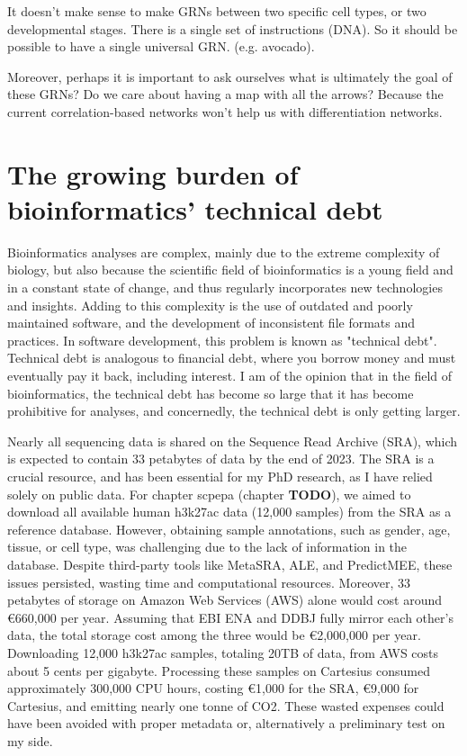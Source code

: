 It doesn't make sense to make GRNs between two specific cell types, or two developmental stages. There is a single set of instructions (DNA). So it should be possible to have a single universal GRN. (e.g. avocado).

Moreover, perhaps it is important to ask ourselves what is ultimately the goal of these GRNs? Do we care about having a map with all the arrows? Because the current correlation-based networks won't help us with differentiation networks. 

\section{The growing burden of bioinformatics' technical debt}

Bioinformatics analyses are complex, mainly due to the extreme complexity of biology, but also because the scientific field of bioinformatics is a young field and in a constant state of change, and thus regularly incorporates new technologies and insights. Adding to this complexity is the use of outdated and poorly maintained software, and the development of inconsistent file formats and practices. In software development, this problem is known as "technical debt". Technical debt is analogous to financial debt, where you borrow money and must eventually pay it back, including interest. I am of the opinion that in the field of bioinformatics, the technical debt has become so large that it has become prohibitive for analyses, and concernedly, the technical debt is only getting larger.

Nearly all sequencing data is shared on the Sequence Read Archive (SRA), which is expected to contain 33 petabytes of data by the end of 2023\cite{srawebsite,Katz2021}. The SRA is a crucial resource, and has been essential for my PhD research, as I have relied solely on public data. For chapter scpepa (chapter \textbf{TODO}), we aimed to download all available human h3k27ac data (12,000 samples) from the SRA as a reference database. However, obtaining sample annotations, such as gender, age, tissue, or cell type, was challenging due to the lack of information in the database. Despite third-party tools like MetaSRA, ALE, and PredictMEE, these issues persisted, wasting time and computational resources. Moreover, 33 petabytes of storage on Amazon Web Services (AWS) alone would cost around €660,000 per year\cite{amazon}. Assuming that EBI ENA and DDBJ fully mirror each other's data, the total storage cost among the three would be €2,000,000 per year. Downloading 12,000 h3k27ac samples, totaling 20TB of data, from AWS costs about 5 cents per gigabyte\cite{amazon}. Processing these samples on Cartesius consumed approximately 300,000 CPU hours, costing €1,000 for the SRA, €9,000 for Cartesius, and emitting nearly one tonne of CO2\cite{CO2}. These wasted expenses  could have been avoided with proper metadata or, alternatively a preliminary test on my side.

